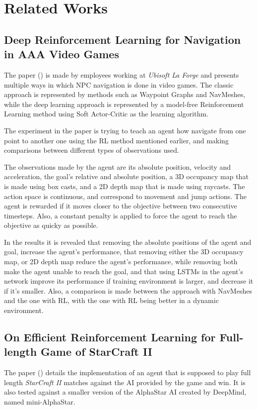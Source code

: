 \chapter{Related Works}

\section{Deep Reinforcement Learning for Navigation in AAA Video Games}
The paper (\cite{alonso2020deeplearningnavigation}) is made by employees working at \emph{Ubisoft La Forge} and presents multiple ways in which NPC navigation is done in video games. The classic approach is represented by methods such as Waypoint Graphs and NavMeshes, while the deep learning approach is represented by a model-free Reinforcement Learning method using Soft Actor-Critic as the learning algorithm. 

The experiment in the paper is trying to teach an agent how navigate from one point to another one using the RL method mentioned earlier, and making comparisons between different types of observations used.

The observations made by the agent are its absolute position, velocity and acceleration, the goal's relative and absolute position, a 3D occupancy map that is made using box casts, and a 2D depth map that is made using raycasts. The action space is continuous, and correspond to movement and jump actions. The agent is rewarded if it moves closer to the objective between two consecutive timesteps. Also, a constant penalty is applied to force the agent to reach the objective as quicky as possible.

In the results it is revealed that removing the absolute positions of the agent and goal, increase the agent's performance, that removing either the 3D occupancy map, or 2D depth map reduce the agent's performance, while removing both make the agent unable to reach the goal, and that using LSTMs in the agent's network improve its performance if training environment is larger, and decrease it if it's smaller. Also, a comparison is made between the approach with NavMeshes and the one with RL, with the one with RL being better in a dynamic environment.



\section{On Efficient Reinforcement Learning for Full-length Game of StarCraft II}
The paper (\cite{liu2022efficientstarcraft2}) details the implementation of an agent that is supposed to play full length \emph{StarCraft II} matches against the AI provided by the game and win. It is also tested against a smaller version of the AlphaStar AI created by DeepMind, named mini-AlphaStar.

